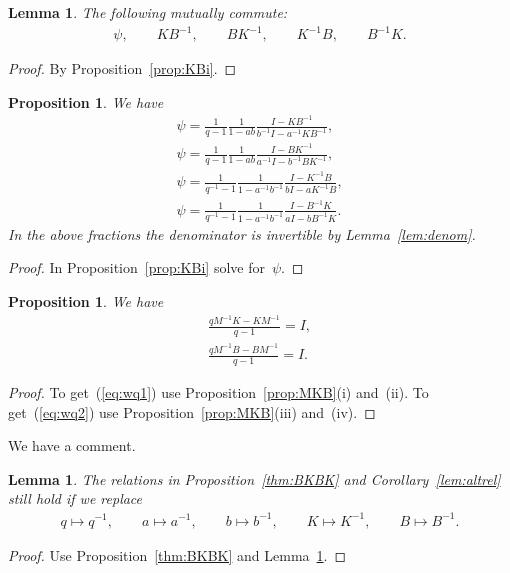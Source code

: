 \documentclass[pdftex]{sigma}
\numberwithin{equation}{section}
\newtheorem{Lemma}[Theorem]{Lemma}
\newtheorem{Proposition}[Theorem]{Proposition}
\begin{document}
\begin{Lemma}\label{lem:BKcom}
The following mutually commute:
\begin{gather*}
\psi,\qquad
KB^{-1}, \qquad
BK^{-1}, \qquad
K^{-1}B, \qquad
B^{-1}K.
\end{gather*}
\end{Lemma}
\begin{proof} By Proposition~\ref{prop:KBi}.
\end{proof}

\begin{Proposition}\label{prop:psiBK}
We have
\begin{gather*}
\psi= \frac{1}{q-1} \frac{1}{1-ab}
\frac{I-KB^{-1}}
{b^{-1}I - a^{-1} KB^{-1}},
\\
\psi = \frac{1}{q-1}
\frac{1}{1-ab}
\frac{I-BK^{-1}}
{a^{-1}I - b^{-1} BK^{-1}},
\\
\psi = \frac{1}{q^{-1}-1}
\frac{1}{1-a^{-1}b^{-1}}
\frac{I-K^{-1}B}
{bI - a K^{-1}B},
\\
\psi = \frac{1}{q^{-1}-1}
\frac{1}{1-a^{-1}b^{-1}}
\frac{I-B^{-1}K}
{aI - b B^{-1}K}.
\end{gather*}
In the above fractions the denominator is invertible by Lemma~{\rm \ref{lem:denom}}.
\end{Proposition}
\begin{proof} In Proposition~\ref{prop:KBi} solve for~$\psi$.
\end{proof}

\begin{Proposition}\label{thm:qWeyl}
We have
\begin{gather}
\frac{qM^{-1}K-KM^{-1}}{q-1} = I,\label{eq:wq1}\\
\frac{qM^{-1}B-BM^{-1}}{q-1} = I.\label{eq:wq2}
\end{gather}
\end{Proposition}
\begin{proof} To get~(\ref{eq:wq1}) use Proposition~\ref{prop:MKB}(i) and~(ii).
To get~(\ref{eq:wq2}) use Proposition~\ref{prop:MKB}(iii) and~(iv).
\end{proof}

We have a comment.
\begin{Lemma}The relations in
Proposition~{\rm \ref{thm:BKBK}}
and Corollary~{\rm \ref{lem:altrel}}
still hold if we replace
\begin{gather*}
q\mapsto q^{-1}, \qquad
a\mapsto a^{-1}, \qquad
b\mapsto b^{-1}, \qquad
K\mapsto K^{-1}, \qquad
B\mapsto B^{-1}.
\end{gather*}
\end{Lemma}
\begin{proof} Use Proposition~\ref{thm:BKBK} and Lemma~\ref{lem:BKcom}.
\end{proof}
\end{document}
